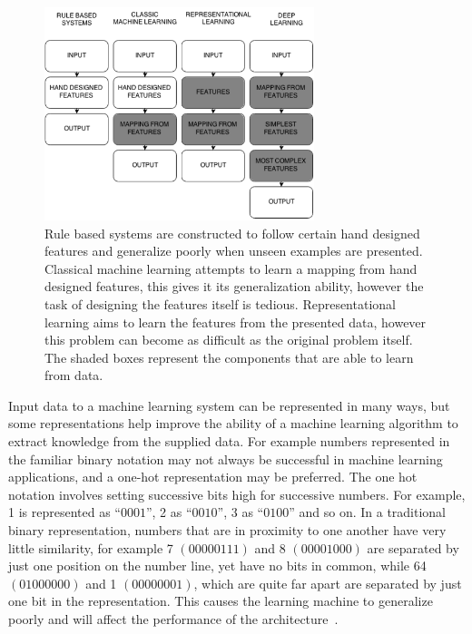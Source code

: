 	\begin{figure}
	\centering
	\includegraphics[width=0.7\textwidth]{Figures/deeplearning}
	\caption[Evolution of machine learning.]{Rule based systems are constructed to follow certain hand designed features and generalize poorly when unseen examples are presented. Classical machine learning attempts to learn a mapping from hand designed features, this gives it its generalization ability, however the task of designing the features itself is tedious. Representational learning aims to learn the features from the presented data, however this problem can become as difficult as the original problem itself. The shaded boxes represent the components that are able to learn from data. }
	\label{fig:deep}
	\end{figure}
	
Input data to a machine learning system can be represented in many ways, but some representations help improve the ability of a machine learning algorithm to extract knowledge from the supplied data. For example numbers represented in the familiar binary notation may not always be successful in machine learning applications, and a one-hot representation may be preferred. The one hot notation involves setting successive bits high for successive numbers. For example, 1 is represented as $“0001”$, 2 as $“0010”$, 3 as $“0100”$ and so on. In a traditional binary representation, numbers that are in proximity to one another have very little similarity, for example 7 $(0000 0111)$ and 8 $(0000 1000)$ are separated by just one position on the number line, yet have no bits in common, while 64 $(0100 0000)$ and 1 $(0000 0001)$, which are quite far apart are separated by just one bit in the representation. This causes the learning machine to generalize poorly and will affect the performance of the architecture~\cite{Bengio-et-al-2014-Book}.

